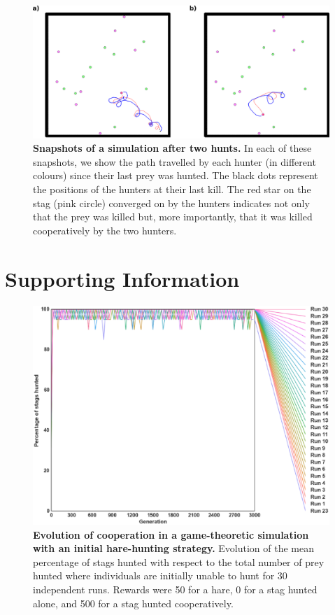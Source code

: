   \begin{figure}[h]
    \centerfloat
      \includegraphics[scale = 0.9]{fig/ArticleBio1/Fig8.eps}
    \caption{\textbf{Snapshots of a simulation after two hunts.}
    In each of these snapshots, we show the path travelled by each hunter (in different colours) since their last prey was hunted. The black dots represent the positions of the hunters at their last kill. The red star on the stag (pink circle) converged on by the hunters indicates not only that the prey was killed but, more importantly, that it was killed cooperatively by the two hunters.}
    \label{fig:behaviourTraces}
  \end{figure}


\section{Supporting Information}
  \begin{figure}[h]
    \centering
      \includegraphics[scale = 0.5]{fig/ArticleBio1/S1_Fig.eps}
    \caption{\textbf{Evolution of cooperation in a game-theoretic simulation with an initial hare-hunting strategy.} 
    Evolution of the mean percentage of stags hunted with respect to the total number of prey hunted where individuals are initially unable to hunt for 30 independent runs. Rewards were 50 for a hare, 0 for a stag hunted alone, and 500 for a stag hunted cooperatively.}
    \label{fig:S1_Fig}
  \end{figure}

